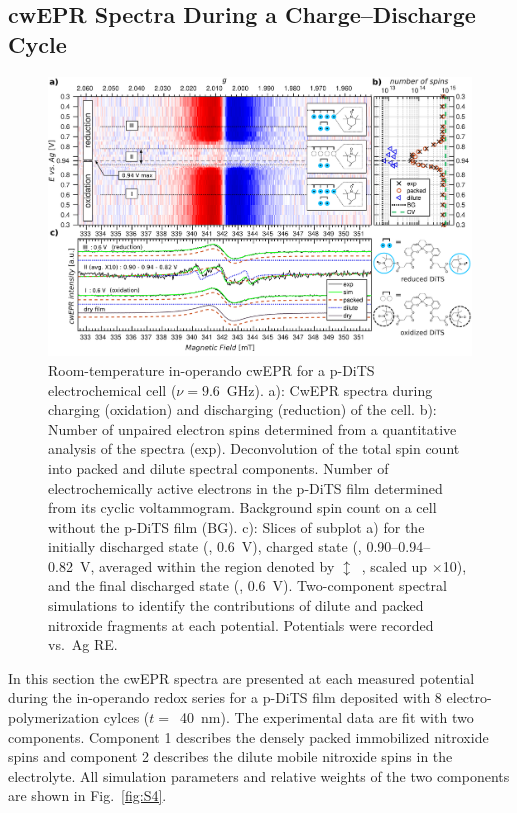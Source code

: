 \subsection{cwEPR Spectra During a Charge--Discharge Cycle}
\label{sec:operando_dits}

\begin{figure}[H]
\center
	\includegraphics[width=1\textwidth]{./operando_epr/figures/Main_2D_redox_map_full.pdf}
	\caption{Room-temperature in-operando cwEPR for a p-DiTS electrochemical cell ($\nu = 9.6$~GHz). a): CwEPR spectra during charging (oxidation) and discharging (reduction) of the cell. b): Number of unpaired electron spins determined from a quantitative analysis of the spectra (exp). Deconvolution of the total spin count into packed and dilute spectral components. Number of electrochemically active electrons in the p-DiTS film determined from its cyclic voltammogram. Background spin count on a cell without the p-DiTS film (BG). c): Slices of subplot a) for the initially discharged state (, 0.6~V), charged state (, 0.90--0.94--0.82~V, averaged within the region denoted by $\updownarrow$~, scaled up $\times$10), and the final discharged state (, 0.6~V). Two-component spectral simulations to identify the contributions of dilute and packed nitroxide fragments at each potential. Potentials were recorded vs.\ Ag RE.}
	\label{fig:operando_carpet}
\end{figure}


In this section the cwEPR spectra are presented at each measured potential during the in-operando redox series for a p-DiTS film deposited with 8 electro-polymerization cylces ($t=$~40~nm). The experimental data are fit with two components. Component 1 describes the densely packed immobilized nitroxide spins and component 2 describes the dilute mobile nitroxide spins in the electrolyte. All simulation parameters and relative weights of the two components are shown in Fig.~\ref{fig:S4}.\\

